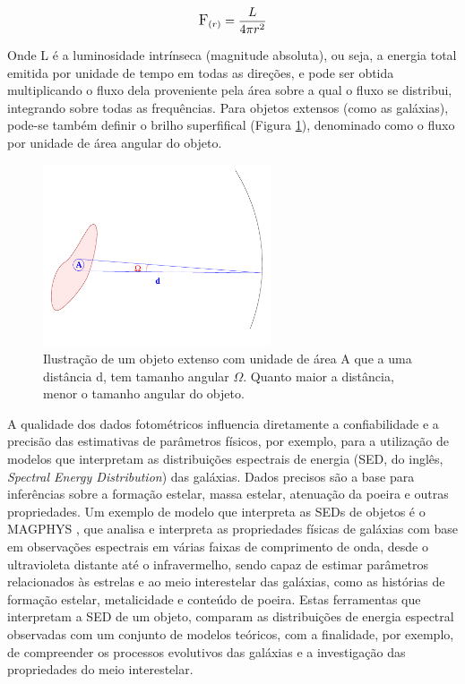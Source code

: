 \begin{equation} \label{eq:flux_estrela}
\large
\text{F}_{(r)} = \frac{L}{4 \pi r^2}
\end{equation}

Onde L é a luminosidade intrínseca (magnitude absoluta), ou seja, a energia total emitida por unidade de tempo em todas as direções, e pode ser obtida multiplicando o fluxo dela proveniente pela área sobre a qual o fluxo se distribui, integrando sobre todas as frequências. Para objetos extensos (como as galáxias), pode-se também definir o brilho superfifical (Figura \ref{fig:brilhosuperficial}), denominado como o fluxo por unidade de área angular do objeto.

\begin{figure}[h]
  \centering 
  \includegraphics[width=0.6\textwidth]{Imagens/brilhosuperficial.PNG} 
  \caption[Propriedades do brilho superficial de um objeto extenso.]{Ilustração de um objeto extenso com unidade de área A que a uma distância d, tem tamanho angular \(\Omega\). Quanto maior a distância, menor o tamanho angular do objeto.}
  \label{fig:brilhosuperficial} 
\end{figure}

A qualidade dos dados fotométricos influencia diretamente a confiabilidade e a precisão das estimativas de parâmetros físicos, por exemplo, para a utilização de modelos que interpretam as distribuições espectrais de energia (SED, do inglês, \emph{Spectral Energy Distribution}) das galáxias. Dados precisos são a base para inferências sobre a formação estelar, massa estelar, atenuação da poeira e outras propriedades. Um exemplo de modelo que interpreta as SEDs de objetos é o MAGPHYS \cite{2011ascl.soft06010D}, que analisa e interpreta as propriedades físicas de galáxias com base em observações espectrais em várias faixas de comprimento de onda, desde o ultravioleta distante até o infravermelho, sendo capaz de estimar parâmetros relacionados às estrelas e ao meio interestelar das galáxias, como as histórias de formação estelar, metalicidade e conteúdo de poeira. Estas ferramentas que interpretam a SED de um objeto, comparam as distribuições de energia espectral observadas com um conjunto de modelos teóricos, com a finalidade, por exemplo, de compreender os processos evolutivos das galáxias e a investigação das propriedades do meio interestelar.



